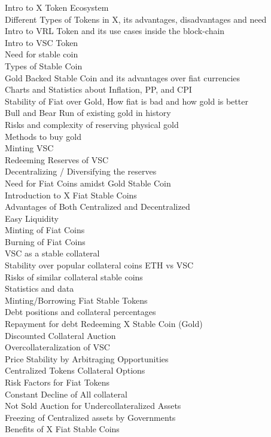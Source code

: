 \documentclass[letterpaper,11pt]{article}
\begin{document}
Intro to X Token Ecosystem\\
Different Types of Tokens in X, its advantages, disadvantages and need\\
Intro to VRL Token and its use cases inside the block-chain\\
Intro to VSC Token\\
Need for stable coin\\
Types of Stable Coin\\
Gold Backed Stable Coin and its advantages over fiat currencies\\
Charts and Statistics about Inflation, PP, and CPI\\
Stability of Fiat over Gold, How fiat is bad and how gold is better\\
Bull and Bear Run of existing gold in history\\
Risks and complexity of reserving physical gold\\
Methods to buy gold\\
Minting VSC\\
Redeeming Reserves of VSC\\
Decentralizing / Diversifying the reserves\\
Need for Fiat Coins amidst Gold Stable Coin\\
Introduction to X Fiat Stable Coins\\
Advantages of Both Centralized and Decentralized\\
Easy Liquidity\\
Minting of Fiat Coins\\
Burning of Fiat Coins\\
VSC as a stable collateral\\
Stability over popular collateral coins ETH vs VSC\\
Risks of similar collateral stable coins\\
Statistics and data\\
Minting/Borrowing Fiat Stable Tokens\\
Debt positions and collateral percentages\\
Repayment for debt Redeeming X Stable Coin (Gold)\\
Discounted Collateral Auction\\
Overcollateralization of VSC\\
Price Stability by Arbitraging Opportunities\\
Centralized Tokens Collateral Options\\
Risk Factors for Fiat Tokens\\
Constant Decline of All collateral\\
Not Sold Auction for Undercollateralized Assets\\
Freezing of Centralized assets by Governments\\
Benefits of X Fiat Stable Coins\\
	
\end{document}
